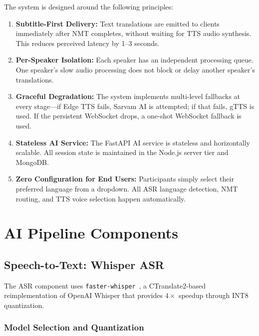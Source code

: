 \documentclass[conference]{IEEEtran}
\begin{document}
The system is designed around the following principles:

\begin{enumerate}
  \item \textbf{Subtitle-First Delivery:} Text translations are emitted to clients immediately after NMT completes, without waiting for TTS audio synthesis. This reduces perceived latency by 1--3 seconds.

  \item \textbf{Per-Speaker Isolation:} Each speaker has an independent processing queue. One speaker's slow audio processing does not block or delay another speaker's translations.

  \item \textbf{Graceful Degradation:} The system implements multi-level fallbacks at every stage---if Edge TTS fails, Sarvam AI is attempted; if that fails, gTTS is used. If the persistent WebSocket drops, a one-shot WebSocket fallback is used.

  \item \textbf{Stateless AI Service:} The FastAPI AI service is stateless and horizontally scalable. All session state is maintained in the Node.js server tier and MongoDB.

  \item \textbf{Zero Configuration for End Users:} Participants simply select their preferred language from a dropdown. All ASR language detection, NMT routing, and TTS voice selection happen automatically.
\end{enumerate}

\section{AI Pipeline Components}
\label{sec:pipeline}

\subsection{Speech-to-Text: Whisper ASR}

The ASR component uses \texttt{faster-whisper}~\cite{fasterwhisper}, a CTranslate2-based reimplementation of OpenAI Whisper that provides $4\times$ speedup through INT8 quantization.

\subsubsection{Model Selection and Quantization}
\end{document}
